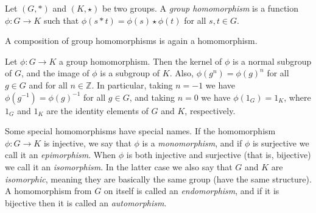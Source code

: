 \documentclass{article}
\def\Z{\mathbb{Z}}
\begin{document}

Let $(G,\ast)$ and $(K,\star)$ be two groups.  A \emph{group homomorphism} is a
function $\phi\colon G \to K$ such that
$\phi (s \ast t) = \phi(s) \star \phi(t)$ for all $s,t \in G$.

A composition of group homomorphisms is again a homomorphism.

Let $\phi\colon G\to K$ a group homomorphism.
Then the kernel of $\phi$ is a normal subgroup of $G$,
and the image of $\phi$ is a subgroup of $K$.
Also, $\phi(g^n)=\phi(g)^n$ for all $g\in G$ and for all $n \in\Z$.
In particular,
taking $n=-1$ we have $\phi(g^{-1})=\phi(g)^{-1}$ for all $g \in G$,
and taking $n=0$ we have $\phi(1_G)=1_K$,
where $1_G$ and $1_K$ are the identity elements of $G$ and $K$,
respectively.

Some special homomorphisms have special names.
If the homomorphism $\phi\colon G\to K$ is injective,
we say that $\phi$ is a \emph{monomorphism},
and if $\phi$ is surjective we call it an \emph{epimorphism}.
When $\phi$ is both injective and surjective (that is, bijective) we call it an \emph{isomorphism}.
In the latter case we also say that $G$ and $K$ are \emph{isomorphic}, meaning they are basically the same group (have the same structure).
A homomorphism from $G$ on itself is called an \emph{endomorphism},
and if it is bijective then it is called an \emph{automorphism}.
\end{document}
